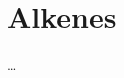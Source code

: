 \documentclass{inVerba-notes}
\begin{document}
\hypertarget{ToC}{\tableofcontents}

\chapter{Alkenes}\label{Alkenes}
\begin{adjustwidth}{1cm}{1cm}
  \dots
\end{adjustwidth}

\end{document}

